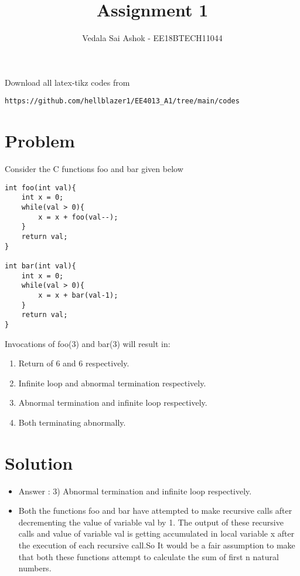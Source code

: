 \documentclass[journal,12pt,twocolumn]{IEEEtran}
\begin{document}
     \def\rightbox#1{\makebox[0in][r]{#1}}
     \def\centbox#1{\makebox[0in]{#1}}
     \def\topbox#1{\raisebox{-\baselineskip}[0in][0in]{#1}}
     \def\midbox#1{\raisebox{-0.5\baselineskip}[0in][0in]{#1}}
\vspace{3cm}
\title{Assignment 1}
\author{Vedala Sai Ashok - EE18BTECH11044}
\maketitle
\newpage
\bigskip
\renewcommand{\thefigure}{\theenumi}
\renewcommand{\thetable}{\theenumi}
Download all latex-tikz codes from 
%
\begin{lstlisting}
https://github.com/hellblazer1/EE4013_A1/tree/main/codes
\end{lstlisting}
\setcounter{figure}{0}
\section{Problem}
Consider the C functions foo and bar given below
\begin{lstlisting}
int foo(int val){
    int x = 0;
    while(val > 0){
        x = x + foo(val--);
    }
    return val;
}

int bar(int val){
    int x = 0;
    while(val > 0){
        x = x + bar(val-1);
    }
    return val;
}
\end{lstlisting}
\setcounter{figure}{0}
Invocations of foo(3) and bar(3) will result in:
\begin{enumerate}
    \item Return of 6 and 6 respectively.
    \item Infinite loop and abnormal termination respectively.
    \item Abnormal termination and infinite loop respectively.
    \item Both terminating abnormally.
\end{enumerate}
\section{Solution}

\begin{itemize}
    \item Answer : 3) Abnormal termination and infinite loop respectively.
    \\
    \item Both the functions foo and bar have attempted to make recursive calls after decrementing the value of variable val by 1. The output of these recursive calls and value of variable val is getting accumulated in local variable x after the execution of each recursive call.So It would be a fair assumption to make that both these functions attempt to calculate the sum of first n natural numbers.
\end{itemize}
\end{document}
